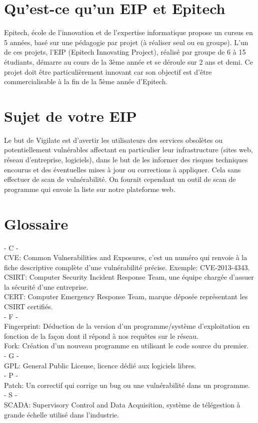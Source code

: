 \section{Qu'est-ce qu’un EIP et Epitech}
Epitech,  école de l'innovation et de l'expertise informatique propose un cursus en 5 années, basé sur une pédagogie par projet (à réaliser seul ou en groupe).  L'un de ces projets, l’EIP (Epitech Innovating Project), réalisé par groupe de 6 à 15 étudiants, démarre au cours de la 3ème année et se déroule sur 2 ans et demi. Ce  projet doit être particulièrement innovant car son objectif est d’être commercialisable à la fin de la 5ème année d’Epitech.

\section{Sujet de votre EIP}
Le but de Vigilate est d’avertir les utilisateurs des services obsolètes ou potentiellement vulnérables affectant en particulier leur infrastructure (sites web, réseau d'entreprise, logiciels), dans le but de les informer des risques techniques encourus et des éventuelles mises à jour ou corrections à appliquer.
Cela sans effectuer de scan de vulnérabilité.
On fournit cependant un outil de scan de programme qui envoie la liste sur notre plateforme web.

\section{Glossaire}
\noindent
- C -\\
CVE: Common Vulnerabilities and Exposures, c'est un numéro qui renvoie à la fiche descriptive complète d'une vulnérabilité précise. Exemple: CVE-2013-4343.\\
CSIRT: Computer Security Incident Response Team, une équipe chargée d'assuer la sécurité d'une entreprise.\\
CERT: Computer Emergency Response Team, marque déposée représentant les CSIRT certifiés.\\
- F -\\
Fingerprint: Déduction de la version d'un programme/système d'exploitation en fonction de la façon dont il répond à nos requêtes sur le réseau.\\
Fork: Création d'un nouveau programme en utilisant le code source du premier.\\
- G -\\
GPL: General Public License, licence dédié aux logiciels libres.\\
- P -\\
Patch: Un correctif qui corrige un bug ou une vulnérabilité dans un programme.\\
- S -\\
SCADA: Supervisory Control and Data Acquisition, système de télégestion à grande échelle utilisé dans l'industrie.\\

